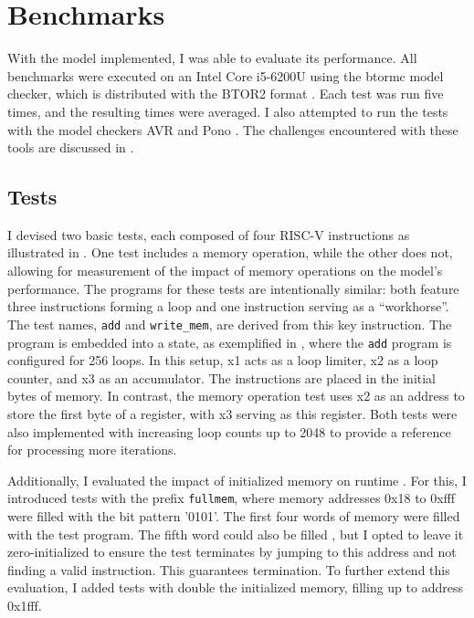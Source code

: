 \chapter{Benchmarks}\label{chap:benchmarks}
With the model implemented, I was able to evaluate its performance.
All benchmarks were executed on an Intel Core i5-6200U using the
btormc model checker, which is distributed with the BTOR2 format
\cite{btor2}. Each test was run five times, and the resulting times
were averaged. I also attempted to run the tests with the model
checkers AVR \cite{avrPaper} and Pono \cite{ponoPaper}. The
challenges encountered with these tools are discussed in
.

\section{Tests}
I devised two basic tests, each composed of four RISC-V instructions
as illustrated in . One test includes a
memory operation, while the other does not, allowing for measurement
of the impact of memory operations on the model's performance. The
programs for these tests are intentionally similar: both feature
three instructions forming a loop and one instruction serving as a
\enquote{workhorse}. The test names, \texttt{add} and
\texttt{write\_mem}, are derived from this key instruction. The
program is embedded into a state, as exemplified in
, where the \texttt{add} program is
configured for 256 loops. In this setup, x1 acts as a loop limiter,
x2 as a loop counter, and x3 as an accumulator. The instructions are
placed in the initial bytes of memory. In contrast, the memory
operation test uses x2 as an address to store the first byte of a
register, with x3 serving as this register. Both tests were also
implemented with increasing loop counts up to 2048 to provide a
reference for processing more iterations.




Additionally, I evaluated the impact of initialized memory on runtime
. For this, I introduced tests with the prefix \texttt{fullmem},
where memory addresses 0x18 to 0xfff were filled with the bit pattern
'0101'. The first four words of memory were filled with the test
program. The fifth word could also be filled , but I opted to leave
it zero-initialized to ensure the test terminates by jumping to this
address and not finding a valid instruction. This guarantees
termination. To further extend this evaluation, I added tests with
double the initialized memory, filling up to address
0x1fff.

